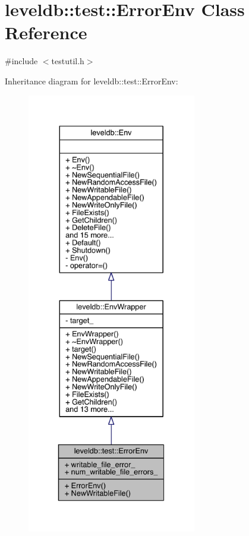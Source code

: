 \hypertarget{classleveldb_1_1test_1_1_error_env}{}\section{leveldb\+:\+:test\+:\+:Error\+Env Class Reference}
\label{classleveldb_1_1test_1_1_error_env}


{\ttfamily \#include $<$testutil.\+h$>$}



Inheritance diagram for leveldb\+:\+:test\+:\+:Error\+Env\+:\nopagebreak
\begin{figure}[H]
\begin{center}
\leavevmode
\includegraphics[height=550pt]{classleveldb_1_1test_1_1_error_env__inherit__graph}
\end{center}
\end{figure}


